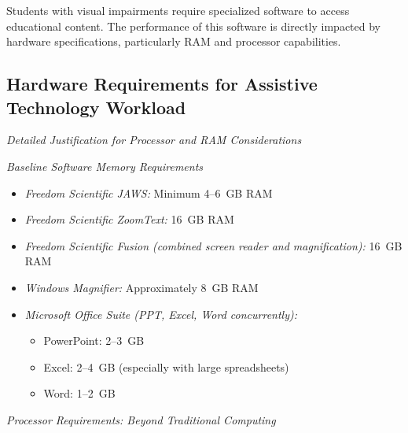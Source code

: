 Students with visual impairments require specialized software to access educational content. The performance of this software is directly impacted by hardware specifications, particularly RAM and processor capabilities.

\subsection{Hardware Requirements for Assistive Technology Workload}\label{hardware-justification-ai-ram}

\emph{Detailed Justification for Processor and RAM Considerations}

\emph{Baseline Software Memory Requirements}
\begin{itemize}
    \item \emph{Freedom Scientific JAWS:} Minimum 4--6~GB RAM
    \item \emph{Freedom Scientific ZoomText:} 16~GB RAM
    \item \emph{Freedom Scientific Fusion (combined screen reader and magnification):} 16~GB RAM
    \item \emph{Windows Magnifier:} Approximately 8~GB RAM
    \item \emph{Microsoft Office Suite (PPT, Excel, Word concurrently):}
        \begin{itemize}
            \item PowerPoint: 2--3~GB
            \item Excel: 2--4~GB (especially with large spreadsheets)
            \item Word: 1--2~GB
        \end{itemize}
\end{itemize}

\emph{Processor Requirements: Beyond Traditional Computing}


